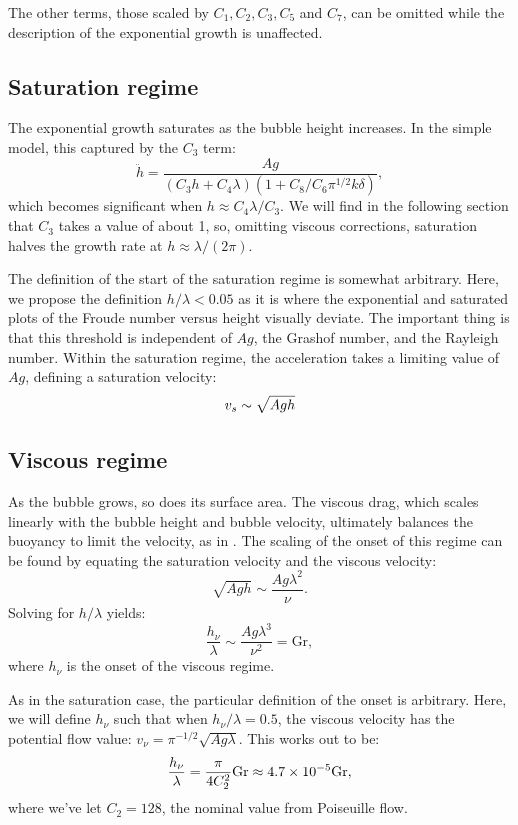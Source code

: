 The other terms, \ie those scaled by $C_1, C_2, C_3, C_5$ and $C_7$, can be omitted while the description of the exponential growth is unaffected.

\subsection{Saturation regime}
The exponential growth saturates as the bubble height increases.
In the simple model, this captured by the $C_3$ term:
\begin{equation}
\ddot{h} = \frac{A g}{(C_3 h + C_4 \lambda) (1 + C_8 / C_6 \pi^{1/2} k \delta)},
\end{equation}
which becomes significant when $h \approx C_4 \lambda / C_3$.
We will find in the following section that $C_3$ takes a value of about 1, so, omitting viscous corrections, saturation halves the growth rate at $h \approx \lambda / (2\pi)$.

The definition of the start of the saturation regime is somewhat arbitrary.
Here, we propose the definition $h/\lambda < 0.05$ as it is where the exponential and saturated plots of the Froude number versus height visually deviate.
The important thing is that this threshold is independent of $Ag$, the Grashof number, and the Rayleigh number.
Within the saturation regime, the acceleration takes a limiting value of $Ag$, defining a saturation velocity:
\begin{equation} \elabel{vel_sat}
v_s \sim \sqrt{A g h}
\end{equation}

\subsection{Viscous regime}
As the bubble grows, so does its surface area.
The viscous drag, which scales linearly with the bubble height and bubble velocity, ultimately balances the buoyancy to limit the velocity, as in .
The scaling of the onset of this regime can be found by equating the saturation velocity and the viscous velocity:
\begin{equation}
\sqrt{A g h} \sim \frac{A g \lambda^2}{\nu}.
\end{equation}
Solving for $h/\lambda$ yields:
\begin{equation}
\frac{h_\nu}{\lambda} \sim \frac{A g \lambda^3}{\nu^2} = \text{Gr},
\end{equation}
where $h_\nu$ is the onset of the viscous regime.

As in the saturation case, the particular definition of the onset is arbitrary.
Here, we will define $h_\nu$ such that when $h_\nu/\lambda = 0.5$, the viscous velocity has the potential flow value: $v_\nu = \pi^{-1/2} \sqrt{A g \lambda}$.
This works out to be:
\begin{equation} \elabel{visc_height}
\frac{h_\nu}{\lambda} = \frac{\pi}{4 C_2^2} \text{Gr} \approx 4.7 \times 10^{-5} \text{Gr},
\end{equation}
where we've let $C_2 = 128$, the nominal value from Poiseuille flow.

